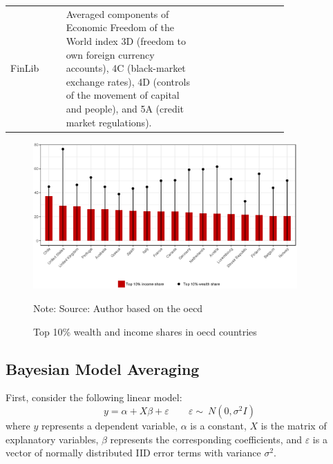 \documentclass[a4paper,11pt]{article}
\begin{document}
\begin{center}
\begin{longtable}{l p{0.50\linewidth} p{0.3\linewidth}}
  FinLib & Averaged components of Economic Freedom of the World index 3D (freedom to own foreign currency accounts), 4C (black-market exchange rates), 4D (controls of the movement of capital and people), and 5A (credit market regulations). & \href{https://www.fraserinstitute.org/economic-freedom/dataset}{\citet{gwartney2017}} \\

\end{longtable}
\end{center}

\begin{figure}[ht!]
	\caption{Top 10\% wealth and income shares in \ac{oecd} countries}
	\centering
	\includegraphics[width=0.9\textwidth]{figures/wealthincome_comp_oecd.eps}
	\label{fig:wealthincome_comp_oecd}
	
	Note: Source: Author based on the \ac{oecd}
\end{figure}

\newpage
\subsection*{Bayesian Model Averaging}
\label{sec:app_bma}
First, consider the following linear model:
%
\begin{equation}
\label{eq:OLS}
y = \alpha + X\beta+ \varepsilon \qquad \varepsilon  \sim\ N(0, \sigma^{2}I)
\end{equation}
%
where $y$ represents a dependent variable, $\alpha$ is a constant, $X$ is the matrix of explanatory variables, $\beta$ represents the corresponding coefficients, and $\varepsilon$ is a vector of normally distributed IID error terms with variance $\sigma^{2}$. 
\end{document}
